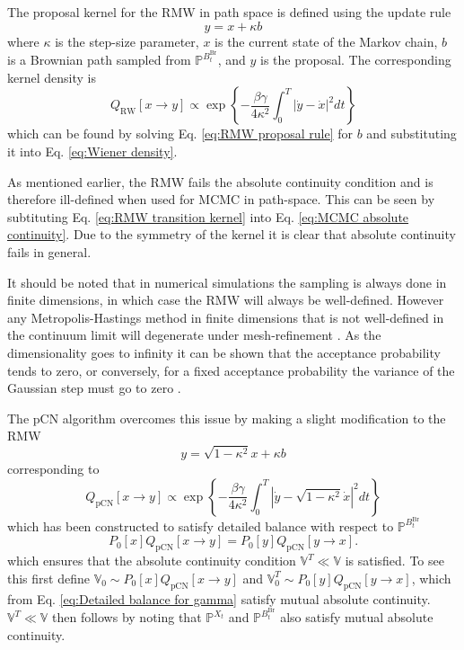 The proposal kernel for the RMW in path space is defined using the update rule
\begin{equation} \label{eq:RMW proposal rule}
y = x + \kappa b
\end{equation}
where $\kappa$ is the step-size parameter, $x$ is the current state of the Markov chain, $b$ is a Brownian path sampled from $\mathbb{P}^{B^\text{Br}_t}$, and $y$ is the proposal. The corresponding kernel density is
\begin{equation} \label{eq:RMW transition kernel}
Q_\text{RW}[x \to y] \propto  \exp \left\{- \frac{\beta \gamma}{4 \kappa^2} \int_0^T |\dot{y}-\dot{x}|^2 dt \right\}
\end{equation}
which can be found by solving Eq. \ref{eq:RMW proposal rule} for $b$ and substituting it into Eq. \ref{eq:Wiener density}.

As mentioned earlier, the RMW fails the absolute continuity condition and is therefore ill-defined when used for MCMC in path-space. This can be seen by subtituting Eq. \ref{eq:RMW transition kernel} into Eq. \ref{eq:MCMC absolute continuity}. Due to the symmetry of the kernel it is clear that absolute continuity fails in general.

It should be noted that in numerical simulations the sampling is always done in finite dimensions, in which case the RMW will always be well-defined. However any Metropolis-Hastings method in finite dimensions that is not well-defined in the continuum limit will degenerate under mesh-refinement \citep{stuartInverseProblemsBayesian2010, cotterMCMCMethodsFunctions2013}.  As the dimensionality goes to infinity it can be shown that the acceptance probability tends to zero, or conversely, for a fixed acceptance probability the variance of the Gaussian step must go to zero \citep{hairerSpectralGapsMetropolis2014, gelmanWeakConvergenceOptimal1997}. 

The pCN algorithm overcomes this issue by making a slight modification to the RMW
\begin{equation} \label{eq:pCN proposal}
y = \sqrt{1 - \kappa^2} x + \kappa b
\end{equation}
corresponding to
\begin{equation} \label{eq:RMW transition kernel}
Q_\text{pCN}[x \to y] \propto \exp \left\{ - \frac{\beta \gamma}{4 \kappa^2} \int_0^T |\dot{y}-\sqrt{1 - \kappa^2}\dot{x}|^2 dt \right\}
\end{equation}
which has been constructed to satisfy detailed balance with respect to $\mathbb{P}^{B^\text{Br}_t}$
\begin{equation} \label{eq:Detailed balance for gamma}
P_0[x] Q_\text{pCN}[x \to y] = P_0[y] Q_\text{pCN}[y \to x] .
\end{equation}
which ensures that the absolute continuity condition $\mathbb{V}^T \ll \mathbb{V}$ is satisfied. To see this first define $\mathbb{V}_0 \sim P_0[x] Q_\text{pCN}[x \to y] $ and $\mathbb{V}^T_0 \sim P_0[y] Q_\text{pCN}[y \to x]$, which from Eq. \ref{eq:Detailed balance for gamma} satisfy mutual absolute continuity. $\mathbb{V}^T \ll \mathbb{V}$ then follows by noting that $\mathbb{P}^{X_t}$ and $\mathbb{P}^{B^\text{Br}_t}$ also satisfy mutual absolute continuity.

